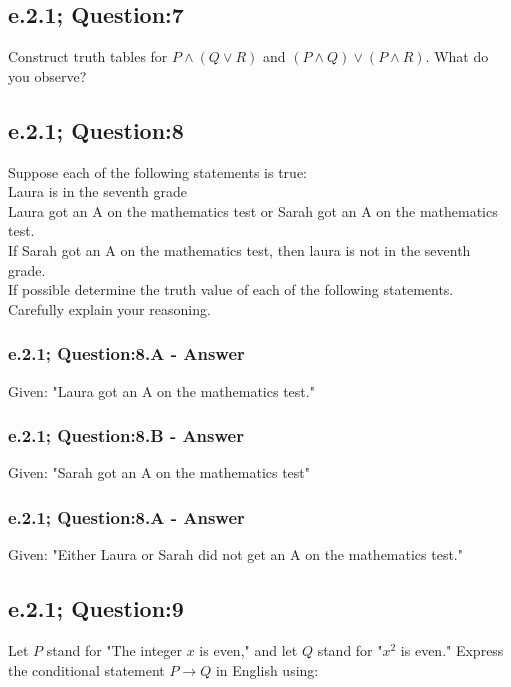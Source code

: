 \subsection{e.2.1; Question:7}
Construct truth tables for $P \wedge (Q \vee R)$ and $(P \wedge Q) \vee (P \wedge R)$. What do you observe? \\


\subsection{e.2.1; Question:8}
Suppose each of the following statements is true: \\
Laura is in the seventh grade \\
Laura got an A on the mathematics test or Sarah got an A on the mathematics test. \\
If Sarah got an A on the mathematics test, then laura is not in the seventh grade. \\

If possible determine the truth value of each of the following statements. Carefully explain your reasoning. \\

\subsubsection*{e.2.1; Question:8.A - Answer}
Given: "Laura got an A on the mathematics test." \\

\subsubsection*{e.2.1; Question:8.B - Answer}
Given: "Sarah got an A on the mathematics test" \\

\subsubsection*{e.2.1; Question:8.A - Answer}
Given: "Either Laura or Sarah did not get an A on the mathematics test." \\


\newpage
\subsection{e.2.1; Question:9}
Let $P$ stand for "The integer $x$ is even," and let $Q$ stand for "$x^2$ is even." Express the conditional statement $P \to Q$ in English using: \\


